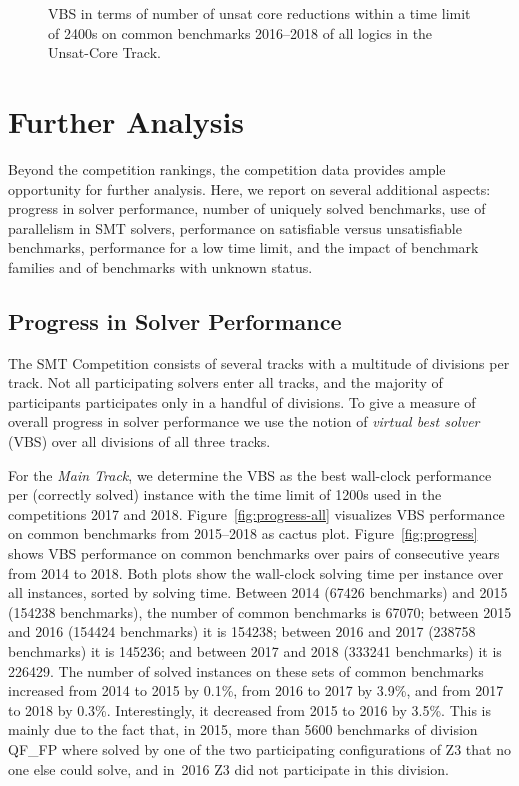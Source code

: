 \documentclass[dvipsnames,table,twoside,11pt]{article}
\newcommand{\maintrack}{Main Track\xspace}
\newcommand{\ucoretrack}{Unsat-Core Track\xspace}
\begin{document}
\begin{figure}
  \centering
  \vspace{-5ex}
  \caption{VBS in terms of number of unsat core reductions
  within a time limit of 2400s
  on common benchmarks 2016--2018 of all logics in the \ucoretrack.}
  \label{fig:progress-all-uc}
\end{figure}

\section{Further Analysis}
\label{sec:analysis}

Beyond the competition rankings, the competition data provides ample
opportunity for further analysis.  Here, we report on several
additional aspects: progress in solver performance, number of uniquely
solved benchmarks, use of parallelism in SMT solvers, performance on
satisfiable versus unsatisfiable benchmarks, performance for a low
time limit, and the impact of benchmark families and of benchmarks
with unknown status.

\subsection{Progress in Solver Performance}

The SMT Competition consists of several tracks with a multitude of divisions
per track.
Not all participating solvers enter all tracks, and the majority of
participants participates only in a handful of divisions.
To give a measure of overall progress in solver performance we
use the notion of \emph{virtual best solver} (VBS) over all divisions of all
three tracks.

For the \emph{\maintrack}, we determine the VBS as the best wall-clock
performance per (correctly solved) instance with the time limit of 1200s used
in the competitions 2017 and 2018. Figure~\ref{fig:progress-all} visualizes VBS
performance on common benchmarks from 2015--2018 as cactus plot.
Figure~\ref{fig:progress} shows VBS performance on common benchmarks over pairs
of consecutive years from 2014 to 2018.  Both plots show the wall-clock solving
time per instance over all instances, sorted by solving time.
%
Between 2014 (\num{67426} benchmarks) and 2015 (\num{154238} benchmarks),
the number of common benchmarks is \num{67070};
between 2015 and 2016 (\num{154424} benchmarks) it is \num{154238};
between 2016 and 2017 (\num{238758} benchmarks) it is \num{145236};
and between 2017 and 2018 (\num{333241} benchmarks) it is \num{226429}.
The number of solved instances on these sets of common benchmarks
increased from 2014 to 2015 by 0.1\%, from 2016 to 2017 by 3.9\%,
and from 2017 to 2018 by 0.3\%.
Interestingly, it decreased from 2015 to 2016 by 3.5\%.
This is mainly due to the fact that, in 2015, more than \num{5600} benchmarks of
division QF\_FP where solved by one of the two participating configurations of
Z3 that no one else could solve, and in~2016 Z3 did not participate in this
division.
\end{document}
